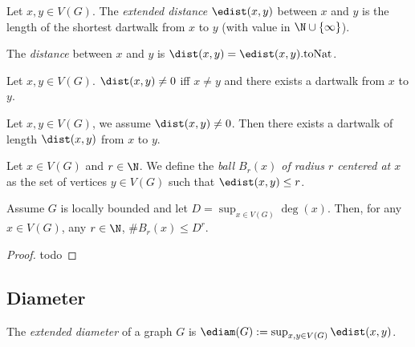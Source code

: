\begin{definition}
  \label{def:edistance}
  \leanok
  Let $x, y \in V(G)$. The \emph{extended distance} $\edist(x,y)$
  between $x$ and $y$
  is the length of the shortest dartwalk from $x$ to $y$ (with value in
  $\N \cup \{\infty\}$).
\end{definition}

\begin{definition}
  \label{def:distance}
  The \emph{distance} between $x$ and $y$
  is $\dist(x,y) = \edist(x,y).\mathrm{toNat}$.
\end{definition}

\begin{lemma}
  \label{lem:distance_ne_zero}
  Let $x, y \in V(G)$. $\dist(x,y) \neq 0$ iff $x \neq y$ and there exists
  a dartwalk from $x$ to $y$.
\end{lemma}

\begin{lemma}
  \label{lem:distance_take}
  Let $x, y \in V(G)$, we assume $\dist(x,y) \neq 0$. Then there exists a dartwalk
  of length $\dist(x,y)$ from $x$ to $y$.
\end{lemma}

\begin{definition}
  \label{def:ball}
  Let $x \in V(G)$ and $r \in \N$.
  We define the \emph{ball $B_r(x)$
  of radius $r$ centered at $x$} as the set of vertices
  $y \in V(G)$ such that $\edist(x,y)\leq r$.
\end{definition}

\begin{proposition}
  \label{prop:growth_ball}
  Assume $G$ is locally bounded and let $D = \sup_{x \in V(G)} \deg (x)$.
  Then, for any $x \in V(G)$, any $r \in \N$,
  $\# B_r(x) \leq D^r$.
\end{proposition}

\begin{proof}
  todo
\end{proof}

\subsection{Diameter}

\begin{definition}
  \label{def:ediameter}
  The \emph{extended diameter} of a graph $G$ is
  $\ediam(G) := \sup_{x,y \in V(G)} \edist(x,y)$.
\end{definition}


